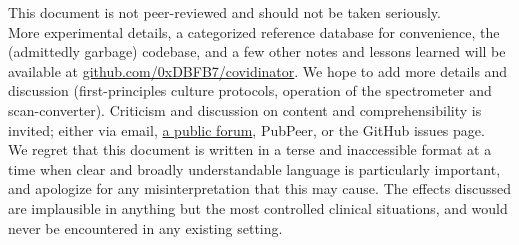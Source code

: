 \documentclass[paper.tex]{subfiles}
\begin{document}
\begin{abstract}
%	
%	
%	
%	
%	
%	
%	
\end{abstract}

\begin{tcolorbox}
\noindent \small{This document is not peer-reviewed and should not be taken seriously.\\
	
More experimental details, a categorized reference database for convenience, the (admittedly garbage) codebase, and a few other notes and lessons learned will be available at 
\href{https://www.github.com/0xDBFB7/covidinator}{github.com/0xDBFB7/covidinator}. We hope to add more details and discussion (first-principles culture protocols, operation of the spectrometer and scan-converter). Criticism and discussion on content and comprehensibility is invited; either via email, \href{https://forum.0xdbfb7.com/t/discussion-on-covidinator/19}{a public forum}, PubPeer, or the GitHub issues page. \\

We regret that this document is written in a terse and inaccessible format at a time when clear and broadly understandable language is particularly important\cite{Re2021}, and apologize for any misinterpretation that this may cause. The effects discussed are implausible in anything but the most controlled clinical situations, and would never be encountered in any existing setting.

}
\end{tcolorbox}
\clearpage
\end{document}
